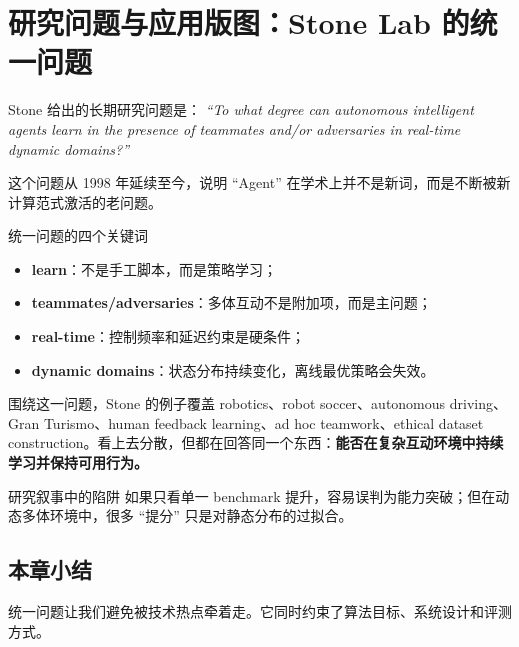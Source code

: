 \section{研究问题与应用版图：Stone Lab 的统一问题}

Stone 给出的长期研究问题是：
\textit{``To what degree can autonomous intelligent agents learn in the presence of teammates and/or adversaries in real-time dynamic domains?''}

这个问题从 1998 年延续至今，说明 ``Agent'' 在学术上并不是新词，而是不断被新计算范式激活的老问题。

\begin{importantbox}{统一问题的四个关键词}
\begin{itemize}
    \item \textbf{learn}：不是手工脚本，而是策略学习；
    \item \textbf{teammates/adversaries}：多体互动不是附加项，而是主问题；
    \item \textbf{real-time}：控制频率和延迟约束是硬条件；
    \item \textbf{dynamic domains}：状态分布持续变化，离线最优策略会失效。
\end{itemize}
\end{importantbox}

围绕这一问题，Stone 的例子覆盖 robotics、robot soccer、autonomous driving、Gran Turismo、human feedback learning、ad hoc teamwork、ethical dataset construction。看上去分散，但都在回答同一个东西：\textbf{能否在复杂互动环境中持续学习并保持可用行为。}

\begin{warningbox}{研究叙事中的陷阱}
如果只看单一 benchmark 提升，容易误判为能力突破；但在动态多体环境中，很多 ``提分'' 只是对静态分布的过拟合。
\end{warningbox}

\subsection{本章小结}
统一问题让我们避免被技术热点牵着走。它同时约束了算法目标、系统设计和评测方式。

